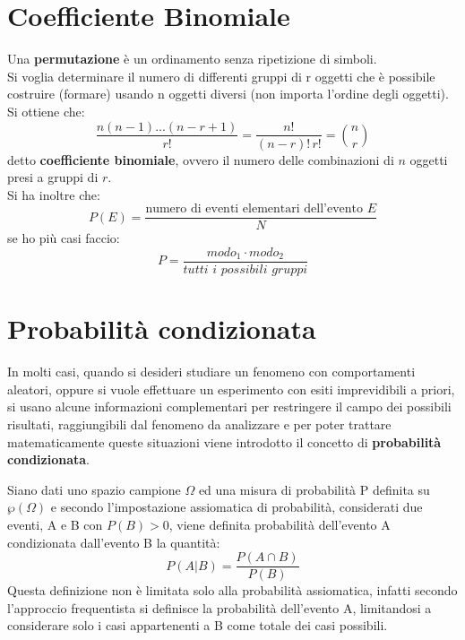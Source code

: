 \documentclass[a4paper,12pt, oneside]{book}
\begin{document}
\section{Coefficiente Binomiale}
Una \textbf{permutazione} è un ordinamento senza ripetizione di simboli.\\
Si voglia determinare il numero di differenti gruppi di r oggetti che è possibile costruire
(formare) usando n oggetti diversi (non importa l’ordine degli oggetti). Si ottiene che:
\[\frac{n(n-1)...(n-r+1)}{r!}=\frac{n!}{(n-r)!\,r!}= {n\choose r}\]
detto \textbf{coefficiente binomiale}, ovvero il numero delle combinazioni di $n$ oggetti presi a gruppi di $r$.\\
Si ha inoltre che:
\[P(E)=\frac{\mbox{numero di eventi elementari dell'evento }E}{N}\]
se ho più casi faccio:
\[P=\frac{modo_1\cdot modo_2}{tutti\,\, i\,\, possibili\,\, gruppi}\]

\section{Probabilità condizionata}
In molti casi, quando si desideri studiare un fenomeno con comportamenti aleatori, oppure si vuole effettuare
un esperimento con esiti imprevidibili a priori, si usano alcune informazioni complementari per restringere 
il campo dei possibili risultati, raggiungibili dal fenomeno da analizzare e per poter trattare matematicamente
queste situazioni viene introdotto il concetto di \textbf{probabilità condizionata}.

Siano dati uno spazio campione $\Omega$ ed una misura di probabilità P definita su $\wp(\Omega)$ e
secondo l’impostazione assiomatica di probabilità, considerati due eventi, A e B con $P(B)>0$,
viene definita  probabilità dell'evento A condizionata dall'evento B la quantità:
\[P(A|B) = \frac{P(A\cap B)}{P(B)} \]
Questa definizione non è limitata solo alla probabilità assiomatica, infatti secondo l'approccio frequentista 
si definisce la probabilità dell'evento A, limitandosi a considerare solo i casi appartenenti a B come totale dei casi possibili.
\end{document}
